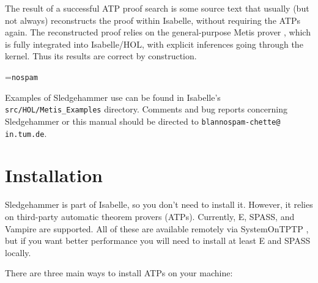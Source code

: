 \documentclass[a4paper,12pt]{article}
\begin{document}
The result of a successful ATP proof search is some source text that usually
(but not always) reconstructs the proof within Isabelle, without requiring the
ATPs again. The reconstructed proof relies on the general-purpose Metis prover
\cite{metis}, which is fully integrated into Isabelle/HOL, with explicit
inferences going through the kernel. Thus its results are correct by
construction.

\newbox\boxA
\setbox\boxA=\hbox{\texttt{nospam}}

Examples of Sledgehammer use can be found in Isabelle's
\texttt{src/HOL/Metis\_Examples} directory.
Comments and bug reports concerning Sledgehammer or this manual should be
directed to
\texttt{blan{\color{white}nospam}\kern-\wd\boxA{}chette@\allowbreak
in.\allowbreak tum.\allowbreak de}.

\smallskipamount


\section{Installation}
\label{installation}

Sledgehammer is part of Isabelle, so you don't need to install it. However, it
relies on third-party automatic theorem provers (ATPs). Currently, E, SPASS, and
Vampire are supported. All of these are available remotely via SystemOnTPTP
\cite{sutcliffe-2000}, but if you want better performance you will need to
install at least E and SPASS locally.

There are three main ways to install ATPs on your machine:
\end{document}
